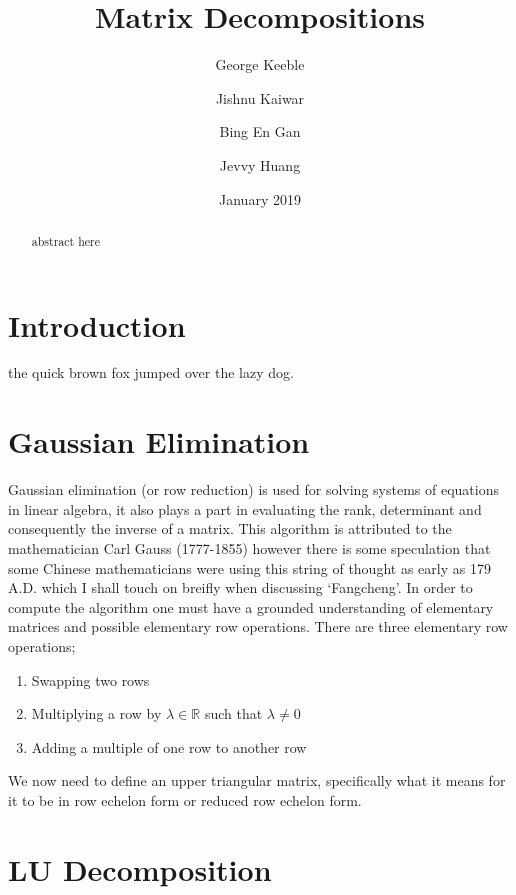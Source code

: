 \documentclass[12pt,reqno,twoside,titlepage]{article}
\begin{document}
\newcommand{\norm}[1]{\left\lVert#1\right\rVert}

\title{Matrix Decompositions}
\author{George Keeble
  \and
  Jishnu Kaiwar
  \and
  Bing En Gan
  \and
  Jevvy Huang
}
\date{January 2019}

\maketitle

\begin{abstract}
  abstract here
\end{abstract}

\section{Introduction}
\label{sec:int}
the quick brown fox jumped over the lazy dog.

\section{Gaussian Elimination}
\label{sec:gaus}

Gaussian elimination (or row reduction) is used for solving systems of equations in linear algebra, it also plays a part in evaluating the rank, determinant and consequently the inverse of a matrix.
This algorithm is attributed to the mathematician Carl Gauss (1777-1855) however there is some speculation that some Chinese mathematicians were using this string of thought as early as 179 A.D. which I shall touch on breifly when discussing ‘Fangcheng’.
In order to compute the algorithm one must have a grounded understanding of elementary matrices and possible elementary row operations.
There are three elementary row operations;

\begin{enumerate}
\item Swapping two rows
\item Multiplying a row by $\lambda \in \mathbb{R}$ such that $\lambda \ne 0$
\item Adding a multiple of one row to another row
\end{enumerate}

We now need to define an upper triangular matrix, specifically what it means for it to be in row echelon form or reduced row echelon form.

\section{LU Decomposition}
\label{sec:LUD}
\end{document}
